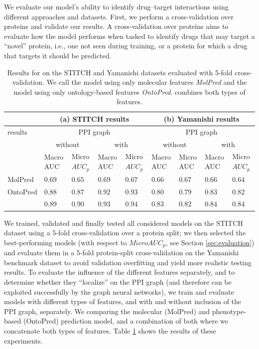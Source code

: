 \documentclass{bioinfo}
\begin{document}
We evaluate our model's ability to identify drug--target interactions
using different approaches and datasets. First, we perform a
cross-validation over proteins and validate our results. A
cross-validation over proteins aims to evaluate how the model performs
when tasked to identify drugs that may target a ``novel'' protein,
i.e., one not seen during training, or a protein for which a drug that
targets it should be predicted. 

\begin{table}[ht]
  \centering
  \begin{tabular}{|p{1.1cm}|p{0.6cm}|p{0.7cm}|p{0.6cm}|p{0.7cm}|p{0.6cm}|p{0.7cm}|p{0.6cm}|p{0.7cm}|}
    \hline
    &\multicolumn{4}{c|}{(a) STITCH results}& \multicolumn{4}{c|}{(b) Yamanishi results}\\
    \hline
    \name{} results&\multicolumn{4}{c|}{PPI graph}&\multicolumn{4}{c|}{PPI graph}\\
    &\multicolumn{2}{c|}{without}&\multicolumn{2}{c|}{with}&\multicolumn{2}{c|}{without}&\multicolumn{2}{c|}{with}\\
    &Macro AUC&Micro $AUC_p$&Macro AUC&Micro $AUC_p$&Macro AUC&Micro AUC&Macro AUC&Micro $AUC_p$\\
    \hline
    MolPred&$0.69$&$0.65$&$0.69$&$0.67$&$0.66$&$0.67$&$0.66$&$0.64$\\
    \hline
    OntoPred&$0.88$&$0.87$&$0.92$&$0.93$&$0.80$&$0.79$&$0.83$&$0.82$\\
    \hline
    \name{} & $0.89$ & $0.90$&$\mathbf{0.93}$&$\mathbf{0.94}$& $0.83$ & $0.82$&$\mathbf{0.84}$&$\mathbf{0.84}$\\
    \hline
  \end{tabular}
  \caption{\label{tab:Results}Results for \name{} on the STITCH
    and Yamanishi datasets evaluated with 5-fold cross-validation. We 
    call the model using only molecular features
    \textit{MolPred} and the model using only ontology-based
    features \textit{OntoPred}. \name{} combines both types of
    features.}
\end{table}

We trained, validated and finally tested all considered models on the
STITCH dataset using a 5-fold cross-validation over a protein split;
we then selected the best-performing models (with respect to
$MicroAUC_p$, see Section \ref{sec:evaluation}) and evaluate them in a
5-fold protein-split cross-validation on the Yamanishi benchmark
dataset to avoid validation overfitting and yield more realistic
testing results. To evaluate the influence of the different features
separately, and to determine whether they ``localize'' on the PPI
graph (and therefore can be exploited successfully by the graph neural
networks), we train and evaluate models with different types of
features, and with and without inclusion of the PPI graph,
separately. We comparing the molecular (MolPred) and phenotype-based
(OntoPred) prediction model, and a combination of both where we
concatenate both types of features.  Table \ref{tab:Results} shows the
results of these experiments.
\end{document}
